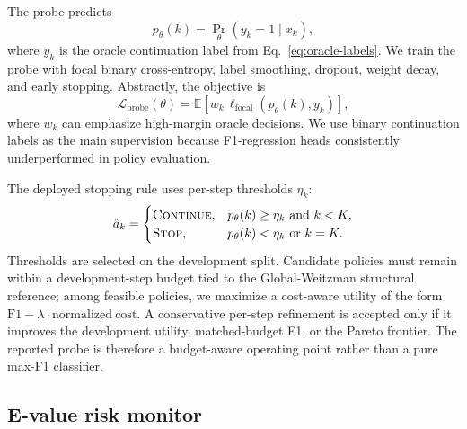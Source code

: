 \documentclass{article}
\begin{document}
The probe predicts
\begin{equation}
  p_\theta(k)=\Pr_\theta(y_k=1\mid x_k),
  \label{eq:probe-prob}
\end{equation}
where $y_k$ is the oracle continuation label from Eq.~\eqref{eq:oracle-labels}. We train the probe with focal binary cross-entropy, label smoothing, dropout, weight decay, and early stopping. Abstractly, the objective is
\begin{equation}
  \mathcal{L}_{\mathrm{probe}}(\theta)
  =
  \mathbb{E}\left[
    w_k\,
    \ell_{\mathrm{focal}}\left(p_\theta(k),y_k\right)
  \right],
  \label{eq:probe-loss}
\end{equation}
where $w_k$ can emphasize high-margin oracle decisions. We use binary continuation labels as the main supervision because F1-regression heads consistently underperformed in policy evaluation.

The deployed stopping rule uses per-step thresholds $\eta_k$:
\begin{equation}
  \hat a_k=
  \begin{cases}
    \textsc{Continue}, & p_\theta(k)\ge \eta_k \text{ and } k<K,\\
    \textsc{Stop}, & p_\theta(k)<\eta_k \text{ or } k=K .
  \end{cases}
  \label{eq:probe-policy}
\end{equation}
Thresholds are selected on the development split. Candidate policies must remain within a development-step budget tied to the Global-Weitzman structural reference; among feasible policies, we maximize a cost-aware utility of the form $\mathrm{F1}-\lambda\cdot\mathrm{normalized\ cost}$. A conservative per-step refinement is accepted only if it improves the development utility, matched-budget F1, or the Pareto frontier. The reported probe is therefore a budget-aware operating point rather than a pure max-F1 classifier.

\subsection{E-value risk monitor}
\label{sec:evalue-method}
\end{document}

